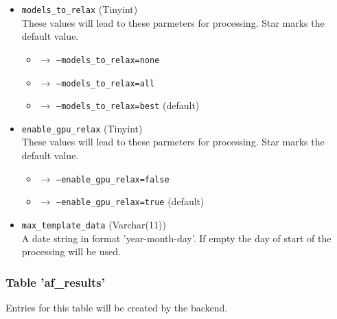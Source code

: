 \documentclass{article}
\begin{document}
\begin{itemize}
\item \texttt{models\_to\_relax} (Tinyint) \\
  These values will lead to these parmeters for processing. Star marks the default value.
  \begin{itemize}
  \item[0] $\to$  \texttt{--models\_to\_relax=none}
  \item[1] $\to$  \texttt{--models\_to\_relax=all}
  \item[2] $\to$  \texttt{--models\_to\_relax=best} (default)
  \end{itemize}

\item \texttt{enable\_gpu\_relax} (Tinyint) \\
  These values will lead to these parmeters for processing. Star marks the default value.
  \begin{itemize}
  \item[0] $\to$  \texttt{--enable\_gpu\_relax=false}
  \item[1] $\to$  \texttt{--enable\_gpu\_relax=true} (default)
  \end{itemize}

\item \texttt{max\_template\_data} (Varchar(11)) \\
  A date string in format 'year-month-day'.
  If empty the day of start of the processing will be used.
\end{itemize}


\subsubsection{Table 'af\_results'}
Entries for this table will be created by the backend.
\end{document}
